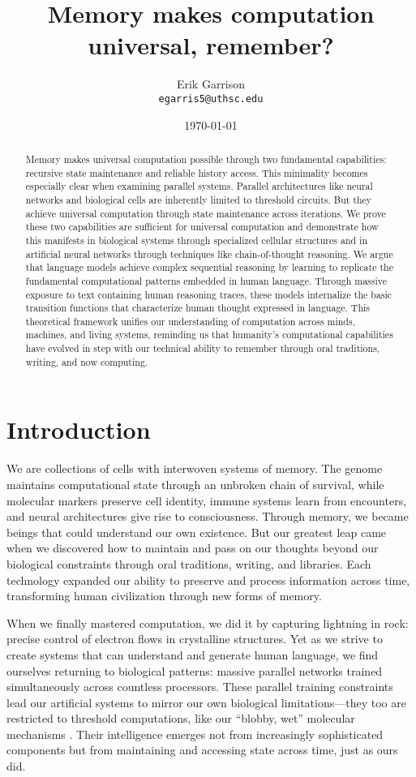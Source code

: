 \documentclass[12pt]{article}
\title{Memory makes computation universal, remember?}
\author{Erik Garrison\\
  \texttt{egarris5@uthsc.edu}\\[1ex]
  }
\date{\today}
\begin{document}
\maketitle

\begin{abstract}
Memory makes universal computation possible through two fundamental capabilities: recursive state maintenance and reliable history access.
This minimality becomes especially clear when examining parallel systems.
Parallel architectures like neural networks and biological cells are inherently limited to threshold circuits.
But they achieve universal computation through state maintenance across iterations.
We prove these two capabilities are sufficient for universal computation and demonstrate how this manifests in biological systems through specialized cellular structures and in artificial neural networks through techniques like chain-of-thought reasoning.
We argue that language models achieve complex sequential reasoning by learning to replicate the fundamental computational patterns embedded in human language.
Through massive exposure to text containing human reasoning traces, these models internalize the basic transition functions that characterize human thought expressed in language.
This theoretical framework unifies our understanding of computation across minds, machines, and living systems, reminding us that humanity's computational capabilities have evolved in step with our technical ability to remember through oral traditions, writing, and now computing.
\end{abstract}

\section{Introduction}

We are collections of cells with interwoven systems of memory.
The genome maintains computational state through an unbroken chain of survival, while molecular markers preserve cell identity, immune systems learn from encounters, and neural architectures give rise to consciousness.
Through memory, we became beings that could understand our own existence.
But our greatest leap came when we discovered how to maintain and pass on our thoughts beyond our biological constraints through oral traditions, writing, and libraries.
Each technology expanded our ability to preserve and process information across time, transforming human civilization through new forms of memory.

When we finally mastered computation, we did it by capturing lightning in rock: precise control of electron flows in crystalline structures.
Yet as we strive to create systems that can understand and generate human language, we find ourselves returning to biological patterns: massive parallel networks trained simultaneously across countless processors.
These parallel training constraints lead our artificial systems to mirror our own biological limitations---they too are restricted to threshold computations, like our ``blobby, wet'' molecular mechanisms \cite{fu2023scgrn}.
Their intelligence emerges not from increasingly sophisticated components but from maintaining and accessing state across time, just as ours did.
\end{document}
